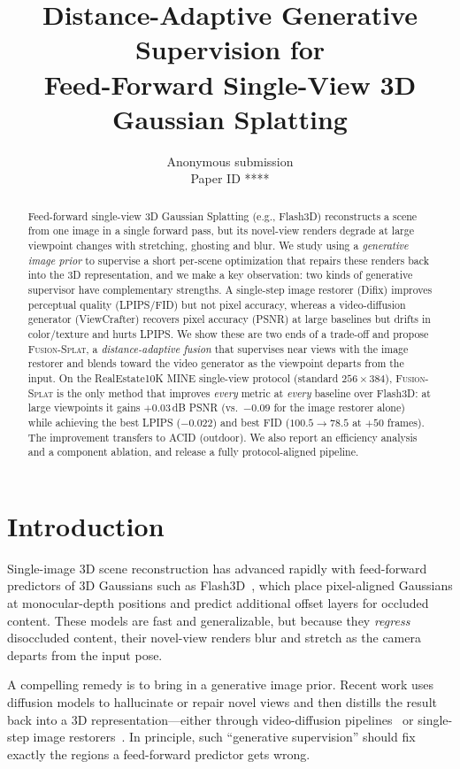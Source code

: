 \documentclass[10pt,twocolumn,letterpaper]{article}
\title{Distance-Adaptive Generative Supervision for\\
Feed-Forward Single-View 3D Gaussian Splatting}
\author{Anonymous submission\\\small Paper ID ****}
\date{}
\newcommand{\method}{\textsc{Fusion-Splat}}
\begin{document}
\maketitle

\begin{abstract}
Feed-forward single-view 3D Gaussian Splatting (e.g., Flash3D) reconstructs a
scene from one image in a single forward pass, but its novel-view renders
degrade at large viewpoint changes with stretching, ghosting and blur. We study
using a \emph{generative image prior} to supervise a short per-scene
optimization that repairs these renders back into the 3D representation, and we
make a key observation: two kinds of generative supervisor have complementary
strengths. A single-step image restorer (Difix) improves perceptual quality
(LPIPS/FID) but not pixel accuracy, whereas a video-diffusion generator
(ViewCrafter) recovers pixel accuracy (PSNR) at large baselines but drifts in
color/texture and hurts LPIPS. We show these are two ends of a trade-off and
propose \method{}, a \emph{distance-adaptive fusion} that supervises near views
with the image restorer and blends toward the video generator as the viewpoint
departs from the input. On the RealEstate10K MINE single-view protocol (standard
$256{\times}384$), \method{} is the only method that improves \emph{every}
metric at \emph{every} baseline over Flash3D: at large viewpoints it gains
$+0.03$\,dB PSNR (vs.\ $-0.09$ for the image restorer alone) while achieving the
best LPIPS ($-0.022$) and best FID ($100.5\!\to\!78.5$ at $+50$ frames). The
improvement transfers to ACID (outdoor). We also report an efficiency analysis
and a component ablation, and release a fully protocol-aligned pipeline.
\end{abstract}

\section{Introduction}
\label{sec:intro}

Single-image 3D scene reconstruction has advanced rapidly with feed-forward
predictors of 3D Gaussians such as Flash3D~\cite{flash3d}, which place
pixel-aligned Gaussians at monocular-depth positions and predict additional
offset layers for occluded content. These models are fast and generalizable,
but because they \emph{regress} disoccluded content, their novel-view renders
blur and stretch as the camera departs from the input pose.

A compelling remedy is to bring in a generative image prior. Recent work uses
diffusion models to hallucinate or repair novel views and then distills the
result back into a 3D representation---either through video-diffusion
pipelines~\cite{scenesplatter,viewcrafter} or single-step image
restorers~\cite{difix}. In principle, such ``generative supervision'' should fix
exactly the regions a feed-forward predictor gets wrong.
\end{document}
